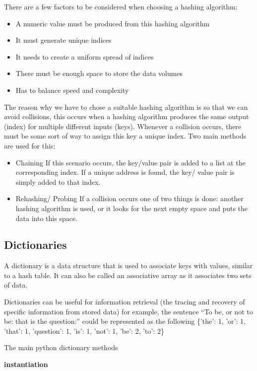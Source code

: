   There are a few factors to be considered when choosing a hashing algorithm:
  \begin{itemize}
  	\item A numeric value must be produced from this hashing algorithm
  	\item It must generate unique indices
  	\item It needs to create a uniform spread of indices
  	\item There must be enough space to store the data volumes
  	\item Has to balance speed and complexity
  \end{itemize}

  The reason why we have to chose a suitable hashing algorithm is so that we can avoid collisions, this occurs when a hashing algorithm produces the same output (index) for multiple different inputs (keys). Whenever a collision occurs, there must be some sort of way to assign this key a unique index. Two main methods are used for this:
  \begin{itemize}
  	\item Chaining
	  	\subitem If this scenario occurs, the key/value pair is added to a list at the corresponding index. If a unique address is found, the key/ value pair is simply added to that index.
  	\item Rehashing/ Probing
	  	\subitem If a collision occurs one of two things is done: another hashing algorithm is used, or it looks for the next empty space and puts the data into this space.
  \end{itemize}
\subsection{Dictionaries}

  A dictionary is a data structure that is used to associate keys with values, similar to a hash table. It can also be called an associative array as it associates two sets of data.

  Dictionaries can be useful for information retrieval (the tracing and recovery of specific information from stored data) for example, the sentence ``To be, or not to be: that is the question:'' could be represented as the following \{'the': 1, 'or': 1, 'that': 1, 'question': 1, 'is': 1, 'not': 1, 'be': 2, 'to': 2\}

  The main python dictionary methods

  \textbf{instantiation}

